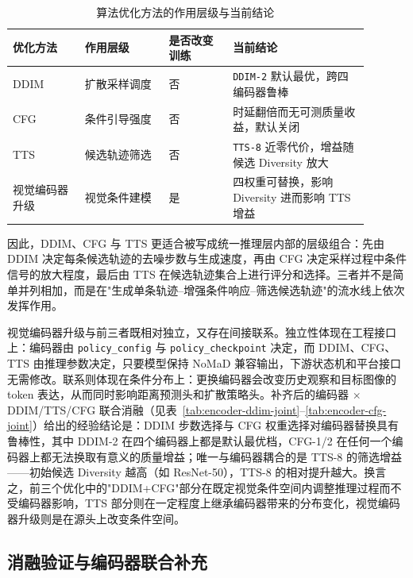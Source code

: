 \begin{table}[htbp]
    \centering
    \small
    \caption{算法优化方法的作用层级与当前结论}
    \label{tab:optimization-role-summary}
    \begin{tabular}{p{0.18\linewidth}p{0.21\linewidth}p{0.16\linewidth}p{0.34\linewidth}}
        \toprule
        优化方法 & 作用层级 & 是否改变训练 & 当前结论 \\
        \midrule
        DDIM & 扩散采样调度 & 否 & \texttt{DDIM-2} 默认最优，跨四编码器鲁棒 \\
        CFG & 条件引导强度 & 否 & 时延翻倍而无可测质量收益，默认关闭 \\
        TTS & 候选轨迹筛选 & 否 & \texttt{TTS-8} 近零代价，增益随候选 Diversity 放大 \\
        视觉编码器升级 & 视觉条件建模 & 是 & 四权重可替换，影响 Diversity 进而影响 TTS 增益 \\
        \bottomrule
    \end{tabular}
\end{table}

因此，DDIM、CFG 与 TTS 更适合被写成统一推理层内部的层级组合：先由 DDIM 决定每条候选轨迹的去噪步数与生成速度，再由 CFG 决定采样过程中条件信号的放大程度，最后由 TTS 在候选轨迹集合上进行评分和选择。三者并不是简单并列相加，而是在"生成单条轨迹--增强条件响应--筛选候选轨迹"的流水线上依次发挥作用。

视觉编码器升级与前三者既相对独立，又存在间接联系。独立性体现在工程接口上：编码器由 \texttt{policy\_config} 与 \texttt{policy\_checkpoint} 决定，而 DDIM、CFG、TTS 由推理参数决定，只要模型保持 NoMaD 兼容输出，下游状态机和平台接口无需修改。联系则体现在条件分布上：更换编码器会改变历史观察和目标图像的 token 表达，从而同时影响距离预测头和扩散策略头。补齐后的编码器 $\times$ DDIM/TTS/CFG 联合消融（见表~\ref{tab:encoder-ddim-joint}--\ref{tab:encoder-cfg-joint}）给出的经验结论是：DDIM 步数选择与 CFG 权重选择对编码器替换具有鲁棒性，其中 DDIM-2 在四个编码器上都是默认最优档，CFG-1/2 在任何一个编码器上都无法换取有意义的质量增益；唯一与编码器耦合的是 TTS-8 的筛选增益——初始候选 Diversity 越高（如 ResNet-50），TTS-8 的相对提升越大。换言之，前三个优化中的"DDIM+CFG"部分在既定视觉条件空间内调整推理过程而不受编码器影响，TTS 部分则在一定程度上继承编码器带来的分布变化，视觉编码器升级则是在源头上改变条件空间。

\subsection{消融验证与编码器联合补充}

